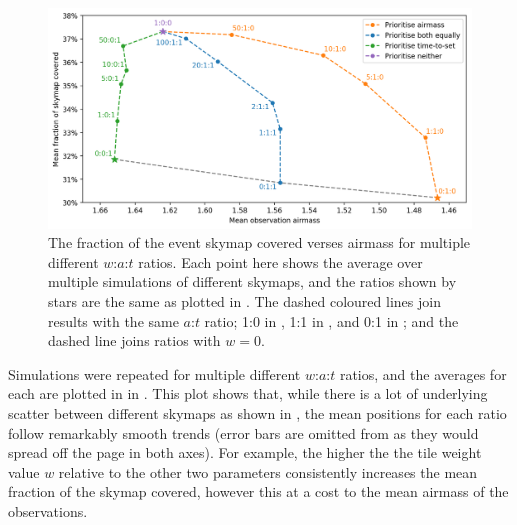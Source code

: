 \begin{colsection}
\begin{figure}[t]
    \begin{center}
        \includegraphics[width=\linewidth]{images/sched_sim2.png}
    \end{center}
    \caption[Scheduler simulation results for different $w$:$a$:$t$ ratios]{
        The fraction of the event skymap covered verses airmass for multiple different $w$:$a$:$t$ ratios. Each point here shows the average over multiple simulations of different skymaps, and the ratios shown by stars are the same as plotted in . The dashed coloured lines join results with the same $a$:$t$ ratio; 1:0 in , 1:1 in , and 0:1 in ; and the  dashed line joins ratios with $w=0$.
    }\label{fig:scheduler_sim_results2}
\end{figure}

Simulations were repeated for multiple different $w$:$a$:$t$ ratios, and the averages for each are plotted in in . This plot shows that, while there is a lot of underlying scatter between different skymaps as shown in , the mean positions for each ratio follow remarkably smooth trends (error bars are omitted from  as they would spread off the page in both axes). For example, the higher the the tile weight value $w$ relative to the other two parameters consistently increases the mean fraction of the skymap covered, however this at a cost to the mean airmass of the observations.


\end{colsection}
